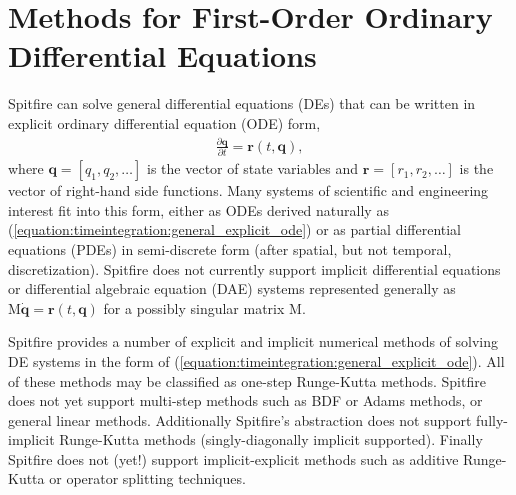 \documentclass[letterpaper,10pt,english]{sphinxmanual}
\begin{document}
\section{Methods for First-Order Ordinary Differential Equations}
\label{\detokenize{timeintegration:methods-for-first-order-ordinary-differential-equations}}
Spitfire can solve general differential equations (DEs) that can be written in explicit ordinary differential equation (ODE) form,
\begin{equation}\label{equation:timeintegration:general_explicit_ode}
\begin{split}\frac{\partial \boldsymbol{q}}{\partial t} = \boldsymbol{r}(t, \boldsymbol{q}),\end{split}
\end{equation}
where \(\boldsymbol{q}=[q_1,q_2,\ldots]\) is the vector of state variables
and \(\boldsymbol{r}=[r_1,r_2,\ldots]\) is the vector of right-hand side functions.
Many systems of scientific and engineering interest fit into this form,
either as ODEs derived naturally as (\ref{equation:timeintegration:general_explicit_ode}) or as
partial differential equations (PDEs) in semi-discrete form (after spatial, but not temporal, discretization).
Spitfire does not currently support implicit differential equations or differential algebraic equation (DAE) systems
represented generally as \(\mathrm{M}\dot{\boldsymbol{q}}=\boldsymbol{r}(t,\boldsymbol{q})\) for a possibly singular matrix \(\mathrm{M}\).

Spitfire provides a number of explicit and implicit numerical methods of solving DE systems in the form of (\ref{equation:timeintegration:general_explicit_ode}).
All of these methods may be classified as one-step Runge-Kutta methods.
Spitfire does not yet support multi-step methods such as BDF or Adams methods, or general linear methods.
Additionally Spitfire’s abstraction does not support fully-implicit Runge-Kutta methods (singly-diagonally implicit  supported).
Finally Spitfire does not (yet!) support implicit-explicit methods such as additive Runge-Kutta or operator splitting techniques.
\end{document}
